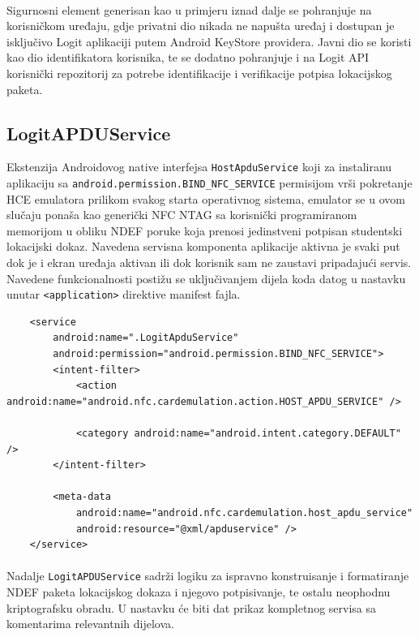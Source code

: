 \paragraph*{}
Sigurnosni element generisan kao u primjeru iznad dalje se pohranjuje na korisničkom uređaju, gdje privatni dio nikada ne napušta uređaj i dostupan je isključivo Logit aplikaciji putem Android KeyStore providera. Javni dio se koristi kao dio identifikatora korisnika, te se dodatno pohranjuje i na Logit API korisnički repozitorij za potrebe identifikacije i verifikacije potpisa lokacijskog paketa.

\subsection{LogitAPDUService}
Ekstenzija Androidovog native interfejsa \texttt{HostApduService} koji za instaliranu aplikaciju sa \texttt{android.permission.BIND\_NFC\_SERVICE} permisijom vrši pokretanje HCE emulatora prilikom svakog starta operativnog sistema, emulator se u ovom slučaju ponaša kao generički NFC NTAG sa korisnički programiranom memorijom u obliku NDEF poruke koja prenosi jedinstveni potpisan studentski lokacijski dokaz. Navedena servisna komponenta aplikacije aktivna je svaki put dok je i ekran uređaja aktivan ili dok korisnik sam ne zaustavi pripadajući servis. Navedene funkcionalnosti postižu se uključivanjem dijela koda datog u nastavku unutar \texttt{<application>} direktive manifest fajla.

\begin{verbatim}
    <service
        android:name=".LogitApduService"
        android:permission="android.permission.BIND_NFC_SERVICE">
        <intent-filter>
            <action android:name="android.nfc.cardemulation.action.HOST_APDU_SERVICE" />

            <category android:name="android.intent.category.DEFAULT" />
        </intent-filter>

        <meta-data
            android:name="android.nfc.cardemulation.host_apdu_service"
            android:resource="@xml/apduservice" />
    </service>
\end{verbatim}

\paragraph*{}
Nadalje \texttt{LogitAPDUService} sadrži logiku za ispravno konstruisanje i formatiranje NDEF paketa\cite{tindef} lokacijskog dokaza i njegovo potpisivanje, te ostalu neophodnu kriptografsku obradu. U nastavku će biti dat prikaz kompletnog servisa sa komentarima relevantnih dijelova.

